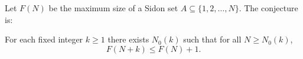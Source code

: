 Let $F(N)$ be the maximum size of a Sidon set $A\subseteq\{1,2,\dots,N\}$.
The conjecture is:

\medskip
\noindent For each fixed integer $k\ge 1$ there exists $N_0(k)$ such that for all $N\ge N_0(k)$,
\[
F(N+k)\le F(N)+1.
\]
